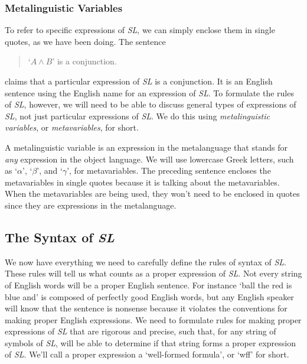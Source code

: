 \documentclass[../logic-text.tex]{subfiles}
\begin{document}
\subsubsection{Metalinguistic Variables}
\label{sec:metal-vari}



To refer to specific expressions of \emph{SL}, we can simply enclose them in single quotes, as we have been doing. The sentence

\begin{quote}
  \enquote*{\(A \land B\)} is a conjunction.
\end{quote}

\noindent claims that a particular expression of \emph{SL} is a conjunction. It is an English sentence using the English name for an expression of \emph{SL}. To formulate the rules of \emph{SL}, however, we will need to be able to discuss general types of expressions of \emph{SL}, not just particular expressions of \emph{SL}. We do this using \emph{metalinguistic variables}, or \emph{metavariables}, for short.

A metalinguistic variable is an expression in the metalanguage that stands for \emph{any} expression in the object language. We will use lowercase Greek letters, such as \enquote*{\(\alpha\)}, \enquote*{\(\beta\)}, and \enquote*{\(\gamma\)}, for metavariables. The preceding sentence encloses the metavariables in single quotes because it is talking about the metavariables. When the metavariables are being used, they won't need to be enclosed in quotes since they are expressions in the metalanguage.

\subsection{The Syntax of \emph{SL}}
\label{sec:syntax-sl}

We now have everything we need to carefully define the rules of syntax of \emph{SL}. These rules will tell us what counts as a proper expression of \emph{SL}. Not every string of English words will be a proper English sentence. For instance \enquote*{ball the red is blue and} is composed of perfectly good English words, but any English speaker will know that the sentence is nonsense because it violates the conventions for making proper English expressions. We need to formulate rules for making proper expressions of \emph{SL} that are rigorous and precise, such that, for any string of symbols of \emph{SL}, will be able to determine if that string forms a proper expression of \emph{SL}. We'll call a proper expression a \enquote*{well-formed formula}, or \enquote*{wff} for short.   
\end{document}
